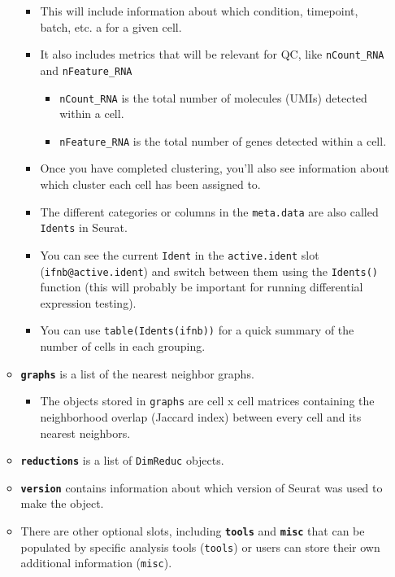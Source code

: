 \documentclass[
  letterpaper,
  DIV=11,
  numbers=noendperiod]{scrreprt}
\providecommand{\tightlist}{%
  \setlength{\itemsep}{0pt}\setlength{\parskip}{0pt}}
\begin{document}
\begin{itemize}
\begin{itemize}
    \begin{itemize}
    \tightlist
    \item
      This will include information about which condition, timepoint,
      batch, etc. a for a given cell.
    \item
      It also includes metrics that will be relevant for QC, like
      \texttt{nCount\_RNA} and \texttt{nFeature\_RNA}

      \begin{itemize}
      \tightlist
      \item
        \texttt{nCount\_RNA} is the total number of molecules (UMIs)
        detected within a cell.
      \item
        \texttt{nFeature\_RNA} is the total number of genes detected
        within a cell.
      \end{itemize}
    \item
      Once you have completed clustering, you'll also see information
      about which cluster each cell has been assigned to.
    \item
      The different categories or columns in the \texttt{meta.data} are
      also called \texttt{Idents} in Seurat.
    \item
      You can see the current \texttt{Ident} in the
      \texttt{active.ident} slot (\texttt{ifnb@active.ident}) and switch
      between them using the \texttt{Idents()} function (this will
      probably be important for running differential expression
      testing).
    \item
      You can use \texttt{table(Idents(ifnb))} for a quick summary of
      the number of cells in each grouping.
    \end{itemize}
  \item
    \textbf{\texttt{graphs}} is a list of the nearest neighbor graphs.

    \begin{itemize}
    \tightlist
    \item
      The objects stored in \texttt{graphs} are cell x cell matrices
      containing the neighborhood overlap (Jaccard index) between every
      cell and its nearest neighbors.
    \end{itemize}
  \item
    \textbf{\texttt{reductions}} is a list of \texttt{DimReduc} objects.
  \item
    \textbf{\texttt{version}} contains information about which version
    of Seurat was used to make the object.
  \item
    There are other optional slots, including \textbf{\texttt{tools}}
    and \textbf{\texttt{misc}} that can be populated by specific
    analysis tools (\texttt{tools}) or users can store their own
    additional information (\texttt{misc}).
  \end{itemize}
\end{itemize}
\end{document}
